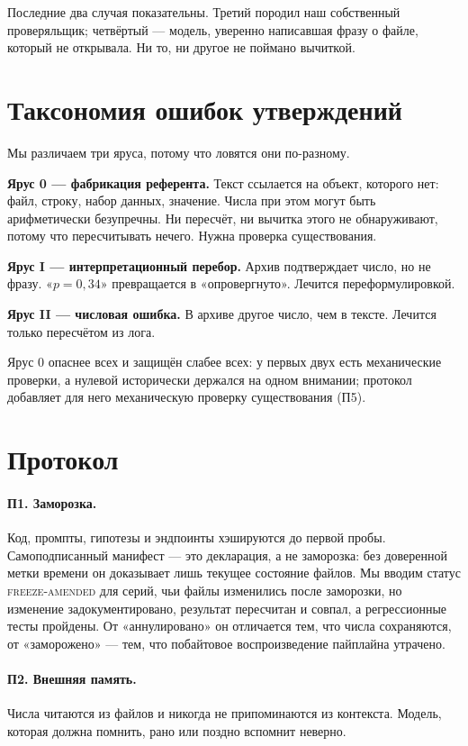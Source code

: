 \documentclass[11pt]{article}
\begin{document}
Последние два случая показательны. Третий породил наш собственный
проверяльщик; четвёртый — модель, уверенно написавшая фразу о файле, который
не открывала. Ни то, ни другое не поймано вычиткой.

\section{Таксономия ошибок утверждений}

Мы различаем три яруса, потому что ловятся они по-разному.

\textbf{Ярус 0 — фабрикация референта.} Текст ссылается на объект, которого
нет: файл, строку, набор данных, значение. Числа при этом могут быть
арифметически безупречны. Ни пересчёт, ни вычитка этого не обнаруживают,
потому что пересчитывать нечего. Нужна проверка существования.

\textbf{Ярус I — интерпретационный перебор.} Архив подтверждает число, но не
фразу. «$p = 0{,}34$» превращается в «опровергнуто». Лечится переформулировкой.

\textbf{Ярус II — числовая ошибка.} В архиве другое число, чем в тексте.
Лечится только пересчётом из лога.

Ярус 0 опаснее всех и защищён слабее всех: у первых двух есть механические
проверки, а нулевой исторически держался на одном внимании; протокол добавляет
для него механическую проверку существования (П5).

\section{Протокол}

\paragraph{П1. Заморозка.} Код, промпты, гипотезы и эндпоинты хэшируются до
первой пробы. Самоподписанный манифест — это декларация, а не заморозка: без
доверенной метки времени он доказывает лишь текущее состояние файлов. Мы
вводим статус \textsc{freeze-amended} для серий, чьи файлы изменились после
заморозки, но изменение задокументировано, результат пересчитан и совпал, а
регрессионные тесты пройдены. От «аннулировано» он отличается тем, что числа
сохраняются, от «заморожено» — тем, что побайтовое воспроизведение пайплайна
утрачено.

\paragraph{П2. Внешняя память.} Числа читаются из файлов и никогда не
припоминаются из контекста. Модель, которая должна помнить, рано или поздно
вспомнит неверно.
\end{document}
